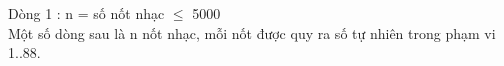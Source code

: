 Dòng 1 : n = số nốt nhạc  $\le$  5000   
\\   Một số dòng sau là n nốt nhạc, mỗi nốt được quy ra số tự nhiên trong phạm vi 1..88.   
\\

\